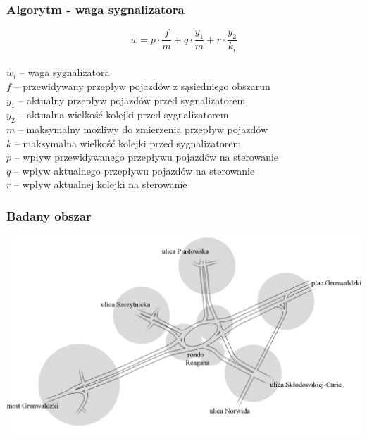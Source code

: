 \documentclass[17pt]{beamer}
\begin{document}
\begin{frame}[shrink=5]
  \frametitle{\vspace{22px}Algorytm - waga sygnalizatora}
  $$w = p \cdot \frac{f}{m} + q \cdot \frac{y_{1}}{m} + r \cdot \frac{y_{2}}{k_{i}}$$\\
  \tiny{
  \begin{math} w_{i} \end{math} -- waga sygnalizatora\\
  \begin{math} f \end{math} -- przewidywany przepływ pojazdów z sąsiedniego obszarun\\
  \begin{math} y_{1} \end{math} -- aktualny przepływ pojazdów przed sygnalizatorem\\
  \begin{math} y_{2} \end{math} -- aktualna wielkość kolejki przed sygnalizatorem\\
  \begin{math} m \end{math} -- maksymalny możliwy do zmierzenia przepływ pojazdów\\
  \begin{math} k \end{math} -- maksymalna wielkość kolejki przed sygnalizatorem\\
  \begin{math} p \end{math} -- wpływ przewidywanego przepływu pojazdów na sterowanie\\
  \begin{math} q \end{math} -- wpływ aktualnego przepływu pojazdów na sterowanie\\
  \begin{math} r \end{math} -- wpływ aktualnej kolejki na sterowanie\\
  }
\end{frame}

\begin{frame}[shrink=5]
  \frametitle{\vspace{22px}Badany obszar}
  \includegraphics[width=1.0\textwidth]{mapa_czysta.png}
\end{frame}
\end{document}
